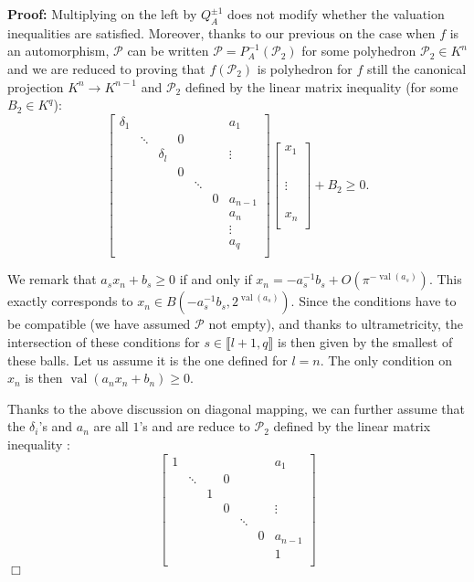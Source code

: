 \documentclass[a4paper,12pt]{article}
\newenvironment{proof}{\hbox{}\vspace{-0.8cm} {\bf Proof:}}{\hfill $\Box$}
\newcommand{\PP}{\mathcal{P}}
\DeclareMathOperator{\val}{val}
\begin{document}
\begin{proof}
Multiplying on the left by $Q_A^{\pm 1}$ does not
modify whether the valuation inequalities are satisfied.
Moreover, thanks to our previous on the case when $f$ is an automorphism,
$\PP$ can be written
$\PP=P_A^{-1}(\PP_2)$ for some polyhedron $\PP_2 \in K^n$
and we are reduced to proving that
$f(\PP_2)$ is polyhedron for $f$ still the canonical projection
$K^n \rightarrow K^{n-1}$ and $\PP_2$
defined by the linear matrix inequality (for some $B_2 \in K^q$):
\[  \begin{bmatrix}
\delta_1	& 		& 			&   &		 &  &a_1	\\
			& \ddots& 			& 0	&		 &	&		\\
			&		& \delta_l  &   & 		 &	& \vdots\\
			&		&			&0  & 		 &	& 		\\
			&		&			&   & \ddots &	&		\\
			&		&			&	&		 & 0&a_{n-1} \\
			&		&			&	&		 &	&a_n 	\\
			&		&			&	&		 &	& \vdots   	\\
			&		&			&	&		 &	&a_q 	\\			
\end{bmatrix} \begin{bmatrix} x_1 \\ \\ \\ \\ \\ \vdots \\ \\ \\ \\ x_n \\ \end{bmatrix} + B_2 \geq 0.\]



We remark that 
$a_s x_n + b_s \geq 0$
if and only if $x_n = -a_s^{-1} b_s + O(\pi^{- \val(a_s)}).$
This exactly corresponds to $x_n \in B(-a_s^{-1} b_s, 2^{\val(a_s)}).$
Since the conditions have to be compatible (we have assumed
$\PP$ not empty), and thanks to ultrametricity,  
the intersection of these conditions for 
$s \in \llbracket l+1,q \rrbracket$
is then given by the smallest of these balls.
Let us assume it is the one defined for $l=n.$
The only condition on $x_n$
is then $\val(a_nx_n +b_n) \geq 0.$

Thanks to the above discussion on diagonal mapping,
we can further assume that the $\delta_i$'s and $a_n$ are all $1$'s
and are reduce to $\PP_2$ defined by the linear matrix inequality :
\[  \begin{bmatrix}
1	& 		& 			&   &		 &  &a_1	\\
			& \ddots& 			& 0	&		 &	&		\\
			&		& 1  &   & 		 &	& \\
			&		&			&0  & 		 &	& 	\vdots	\\
			&		&			&   & \ddots &	&		\\
			&		&			&	&		 & 0&a_{n-1} \\
			&		&			&	&		 &	&1 	\\
		

\end{bmatrix}\]
\end{proof}
\end{document}
